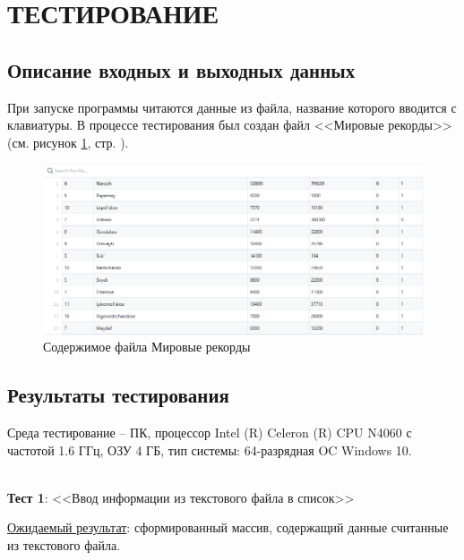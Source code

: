 \newpage

\section{ТЕСТИРОВАНИЕ}

\subsection{Описание входных и выходных данных}

При запуске программы читаются данные из файла, название которого вводится с клавиатуры. В процессе тестирования был создан файл <<Мировые рекорды>> (см. рисунок \ref{fig:data_tsv_github}, стр. \pageref{fig:data_tsv_github}).

\begin{figure}[!htp]
    \begin{center}
        \includegraphics[width=14cm]{../includes_PZ/tests/data-tsv-github.png}
    \end{center}
    \caption{Содержимое файла Мировые рекорды \label{fig:data_tsv_github}}
\end{figure}

\subsection{Результаты тестирования}

Среда тестирование – ПК, процессор Intel (R) Celeron (R) CPU N4060 с частотой 1.6 ГГц, ОЗУ 4 ГБ, тип системы: 64-разрядная OC Windows 10.

\hspace{0pt}\\



\textbf{Тест 1}: <<Ввод информации из текстового файла в список>>

\underline{Ожидаемый результат}: сформированный массив, содержащий данные считанные из текстового файла.

